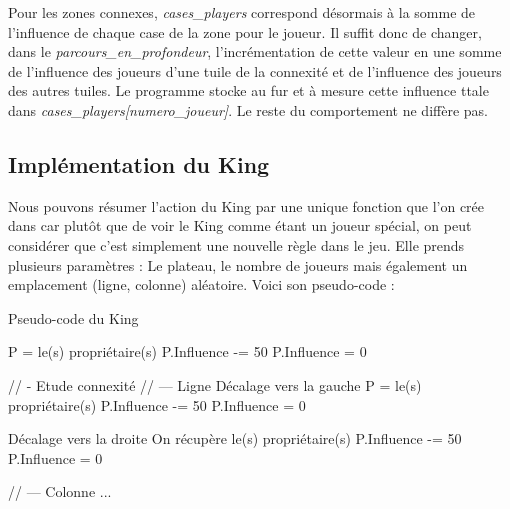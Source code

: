 \documentclass[a4paper]{article}
\begin{document}
Pour les zones connexes, \emph{cases\_players} correspond désormais à la somme de l'influence de chaque case de la zone pour le joueur. Il suffit donc de changer, dans le \emph{parcours\_en\_profondeur}, l'incrémentation de cette valeur en une somme de l'influence des joueurs d'une tuile de la connexité et de l'influence des joueurs des autres tuiles. Le programme stocke au fur et à mesure cette influence ttale dans \emph{cases\_players[numero\_joueur]}. Le reste du comportement ne diffère pas. \\


\subsection{Implémentation du King}
Nous pouvons résumer l'action du King par une unique fonction que l'on crée dans  car plutôt que de voir le King comme étant un joueur spécial, on peut considérer que c'est simplement une nouvelle règle dans le jeu. Elle prends plusieurs paramètres : Le plateau, le nombre de joueurs mais également un emplacement (ligne, colonne) aléatoire. Voici son pseudo-code :
\newpage

\begin{algorithm}
    \caption{Pseudo-code du King}
    \begin{algorithmic}
            \STATE P = le(s) propriétaire(s)
                \STATE P.Influence -= 50
            \ELSE
                \STATE P.Influence = 0
            \ENDIF
        \ENDIF
        
        \STATE // - Etude connexité
        \STATE      // --- Ligne
            \STATE Décalage vers la gauche
            \STATE P = le(s) propriétaire(s)
                \STATE P.Influence -= 50
            \ELSE
                \STATE P.Influence = 0
            \ENDIF
        \ENDWHILE
        
            \STATE Décalage vers la droite
            \STATE On récupère le(s) propriétaire(s)
                \STATE P.Influence -= 50
            \ELSE
                \STATE P.Influence = 0
            \ENDIF
        \ENDWHILE
        
        \STATE      // --- Colonne
        \STATE          ...
        
    \end{algorithmic}
\end{algorithm}
\end{document}
